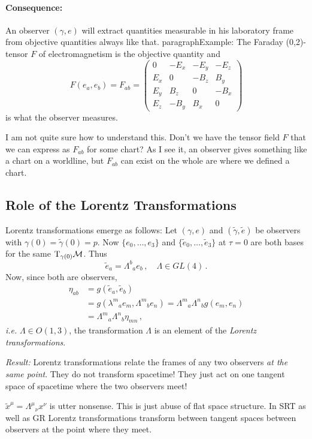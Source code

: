 \paragraph{Consequence:}
An observer $(\gamma, e)$ will extract quantities measurable in his laboratory frame
from objective quantities always like that.
paragraph{Example:}
The Faraday (0,2)-tensor $F$ of electromagnetism is the objective quantity and
\begin{equation}
    F(e_a, e_b) = F_{ab} = 
    \begin{pmatrix}
        0     & -E_x & -E_y & -E_z \\
        E_x &  0     & -B_z   &  B_y    \\
        E_y &  B_z   &  0     & -B_x   \\
        E_z & -B_y   &  B_x   &  0
    \end{pmatrix}
\end{equation}
is what the observer measures.
\begin{note}
    I am not quite sure how to understand this.
    Don't we have the tensor field $F$ that we can express as $F_{ab}$ for some
    chart?
    As I see it, an observer gives something like a chart on a worldline, but
    $F_{ab}$ can exist on the whole are where we defined a chart.
\end{note}

\subsection{Role of the Lorentz Transformations}
Lorentz transformations emerge as follows:
Let $(\gamma, e)$ and $(\tilde{\gamma}, \tilde{e})$ be observers with
$\gamma(0) = \tilde{\gamma}(0) = p$.
Now $\{e_0, \dots, e_3\}$ and $\{\tilde{e}_0, \dots, \tilde{e}_3\}$ at $\tau=0$
are both bases for the same $\T_{\gamma(0)}\M$.
Thus
\begin{equation}
    \tilde{e}_a = \Lambda^b{}_a e_b\,,\quad \Lambda \in GL(4)\,.
\end{equation}
Now, since both are observers,
\begin{align}
    \eta_{ab} &= g(\tilde{e}_a, \tilde{e}_b)\\
    &= g\left( \lambda^m{}_a e_m, \Lambda^m{}_b e_n \right) =
    \Lambda^m{}_a \Lambda^n{}_b g(e_m, e_n) \\
    &= \Lambda^m{}_a \Lambda^n{}_b \eta_{mn}\,,
\end{align}
\textit{i.e.} $\Lambda \in O(1,3)$, the transformation $\Lambda$ is an element
of the \textit{Lorentz transformations}.

\textit{Result:} Lorentz transformations relate the frames of any two observers
\textit{at the same point}.
They do not transform spacetime! They just act on one tangent space of spacetime
where the two observers meet!
\begin{note}
    $\tilde{x}^\mu = \Lambda^\mu{}_\nu x^\nu$ is utter nonsense.
    This is just abuse of flat space structure.
    In SRT as well as GR Lorentz transformations transform between tangent spaces
    between observers at the point where they meet.
\end{note}

